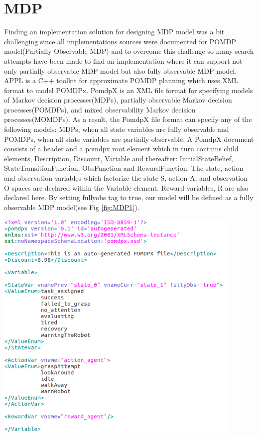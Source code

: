 \clearpage

\section{MDP}
Finding an implementation solution for designing MDP model was a bit challenging since all implementations sources were documented for POMDP model(Partially Observable MDP) and to overcome this challenge so many search attempts have been made to find an implementation where it can support not only partially observable MDP model but also fully observable MDP model. \\
APPL is a C++ toolkit for approximate POMDP planning which uses XML format to model POMDPx. PomdpX is an XML file format for specifying models of Markov decision processes(MDPs), partially observable Markov decision processes(POMDPs), and mixed observability Markov decision processes(MOMDPs). As a result, the PomdpX file format can specify any of the following models: MDPs, when all state variables are fully observable and POMDPs, when all state variables are partially observable. A PomdpX document consists of a header and a pomdpx root element which in turn contains child elements, Description, Discount, Variable and thereafter: InitialStateBelief, StateTransitionFunction, ObsFunction and RewardFunction. The state, action and observation variables which factorize the state S, action A, and observation O spaces are declared within the Variable element. Reward variables, R are also declared here. By setting fullyobs tag to true, our model will be defined as a fully observable MDP model(see Fig \ref{fig:MDP1}). 

\begin{minipage}{0.8\textwidth}
\centering
	\includegraphics[width=12cm]{Pictures/func/MDP/MDP1.png}
	\label{fig:MDP1}
\end{minipage}

